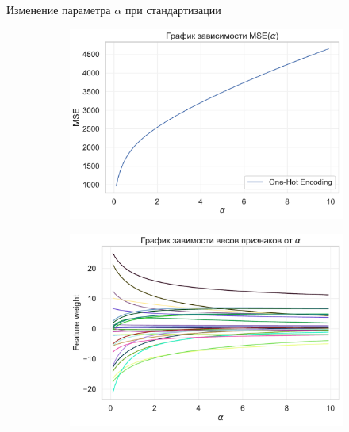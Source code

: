 \documentclass{beamer} %
\begin{document}
    \begin{frame}{Изменение параметра $\alpha$ при стандартизации}
        \begin{figure}
            \centering
            \begin{subfigure}[b]{0.475\textwidth}
                \centering
                \includegraphics[width=\textwidth]{MSE_plot_oh_scaled.pdf}
            \end{subfigure}
            \hfill
            \begin{subfigure}[b]{0.475\textwidth}  
                \centering 
                \includegraphics[width=\textwidth]{feature_plot_oh_scaled.pdf}
            \end{subfigure}
            \begin{subfigure}[b]{0.475\textwidth}   
                \centering 

\end{subfigure}
\end{figure}
\end{frame}
\end{document}

